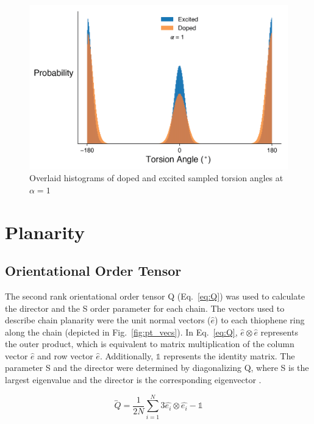 \begin{figure}[hbt!]
    \centering
    \includegraphics{figures/append_tor_model/a_1_hist.png}
    \caption[Histogram of Doped and Excited Sampled Torsion Angles at $\alpha = 1$]{Overlaid histograms of doped and excited sampled torsion angles at $\alpha = 1$}
    \label{fig:a_1_hist}
\end{figure}

\clearpage
\section{Planarity}
\label{sec:planarity}
\subsection{Orientational Order Tensor}

The second rank orientational order tensor Q (Eq.~\ref{eq:Q}) was used to calculate the director and the S order parameter for each chain. The vectors used to describe chain planarity were the unit normal vectors ($\hat{e}$) to each thiophene ring along the chain (depicted in Fig.~\ref{fig:pt_vecs}). In Eq.~\ref{eq:Q}, $\hat{e} \otimes \hat{e}$ represents the outer product, which is equivalent to matrix multiplication of the column vector $\hat{e}$ and row vector $\hat{e}$. Additionally, $\mathds{1}$ represents the identity matrix. The parameter S and the director were determined by diagonalizing Q, where S is the largest eigenvalue and the director is the corresponding eigenvector \cite{Allen2017}.

\begin{equation}
\overleftrightarrow{Q} = \frac{1}{2N} \sum_{i=1}^{N} 3\hat{e_i} \otimes \hat{e_i} - \mathds{1}
\label{eq:Q}
\end{equation}
